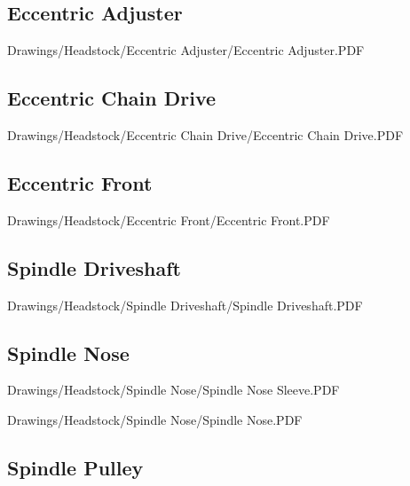 \subsection{Eccentric Adjuster}


{Drawings/Headstock/Eccentric Adjuster/Eccentric Adjuster.PDF}

\subsection{Eccentric Chain Drive}


{Drawings/Headstock/Eccentric Chain Drive/Eccentric Chain Drive.PDF}

\subsection{Eccentric Front}


{Drawings/Headstock/Eccentric Front/Eccentric Front.PDF}

\subsection{Spindle Driveshaft}


{Drawings/Headstock/Spindle Driveshaft/Spindle Driveshaft.PDF}

\subsection{Spindle Nose}


{Drawings/Headstock/Spindle Nose/Spindle Nose Sleeve.PDF}


{Drawings/Headstock/Spindle Nose/Spindle Nose.PDF}

\subsection{Spindle Pulley}

